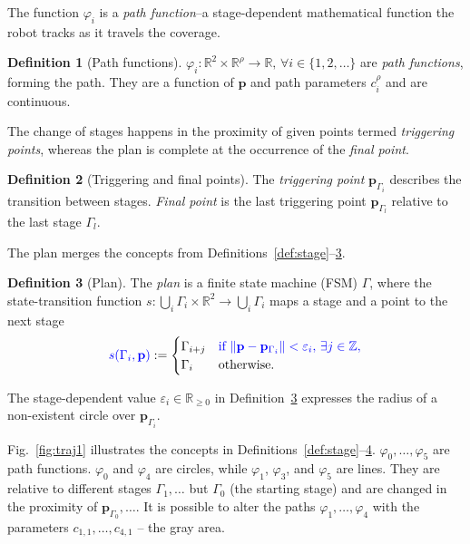 \documentclass[letterpaper,10pt,journal,twoside]{IEEEtran}
\DeclarePairedDelimiter\norm{\lVert}{\rVert}%
\theoremstyle{definition}
\newtheorem{defn}{Definition}[section]
\begin{document}
The function $\varphi_i$ is a \emph{path function}{\color{blue}--a }%
stage-dependent mathematical function %
the %
robot tracks as it travels %
the coverage. 

\begin{defn}[Path functions]
  \label{def:paths}
  $\varphi_i:\mathbb{R}^2\times\mathbb{R}^\rho\rightarrow\mathbb{R},\,\forall i\in\{1,2,\dots\}
  $ are \emph{path functions}, forming the path. They are a function of {\color{blue}$\mathbf{p}%
  $} and path parameters $c_i^\rho%
  $ and are continuous.%
\end{defn}

The change of stages happens in the proximity of given points termed \emph{triggering points}, whereas the plan is complete at the occurrence of the \emph{final point}.

\begin{defn}[Triggering and final points]
  \label{def:trigs}
  The \emph{triggering point} $\mathbf{p}_{\Gamma_{i}}$ describes the transition between stages. \emph{Final point} is the last triggering point $\mathbf{p}_{\Gamma_{l}}$ relative to the last stage $\Gamma_l$.
\end{defn}

The plan merges the concepts from Definitions~\ref{def:stage}--\hyperref[def:trigs]{3}. %

\begin{defn}[Plan]\label{def:plan}
  The \emph{plan} is a finite state machine (FSM) $\Gamma$, where the state-transition function $s:\bigcup_i{\Gamma_i}\times\mathbb{R}^2\rightarrow\bigcup_i{\Gamma_i}$ maps a stage and a point to the next stage
  \begin{equation*}{\color{blue}s(\Gamma_i,\mathbf{p}%
    )}:=\begin{cases}
    \Gamma_{i+j} & {\color{blue}\text{if }\norm{\mathbf{p}%
    -\mathbf{p}_{\Gamma_i}}<\varepsilon_i,\,\exists j\in\mathbb{Z},}\\
    \Gamma_i & \text{otherwise}.
  \end{cases}\end{equation*}
\end{defn}

The stage-dependent value $\varepsilon_i\in\mathbb{R}_{\geq 0}$ in Definition~\ref{def:plan} expresses the radius of a non-existent circle over $\mathbf{p}_{\Gamma_i}$.

Fig.~\ref{fig:traj1} illustrates the concepts in Definitions~\ref{def:stage}--\hyperref[def:plan]{4}. $\varphi_0,\dots,\varphi_5$ are path functions. $\varphi_0$ and $\varphi_4$ are circles, while $\varphi_1$, $\varphi_3$, and $\varphi_5$ are lines. They are relative to different stages $\Gamma_1,\dots$ but $\Gamma_0$ (the starting stage) and are changed in the proximity of $\mathbf{p}_{\Gamma_0},\dots$. %
It is possible to alter the paths $\varphi_1,\dots,\varphi_4$ with the parameters $c_{1,1},\dots,c_{4,1}$ --%
the gray area.%
\end{document}
